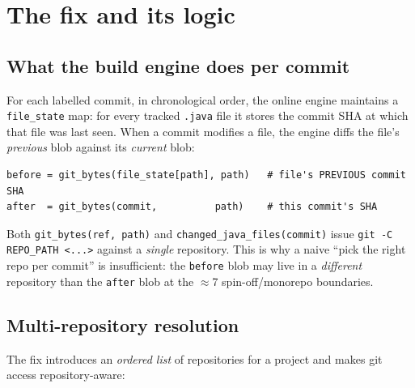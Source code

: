 \documentclass[11pt]{article}
\newcommand{\code}[1]{\texttt{#1}}
\begin{document}
\section{The fix and its logic}
\label{sec:fix}

\subsection{What the build engine does per commit}
For each labelled commit, in chronological order, the online engine maintains a
\code{file\_state} map: for every tracked \code{.java} file it stores the commit
SHA at which that file was last seen. When a commit modifies a file, the engine
diffs the file's \emph{previous} blob against its \emph{current} blob:

\begin{lstlisting}
before = git_bytes(file_state[path], path)   # file's PREVIOUS commit SHA
after  = git_bytes(commit,          path)    # this commit's SHA
\end{lstlisting}

Both \code{git\_bytes(ref, path)} and \code{changed\_java\_files(commit)} issue
\code{git -C REPO\_PATH <...>} against a \emph{single} repository. This is why a
naive ``pick the right repo per commit'' is insufficient: the \code{before} blob
may live in a \emph{different} repository than the \code{after} blob at the
$\approx$7 spin-off/monorepo boundaries.

\subsection{Multi-repository resolution}
The fix introduces an \emph{ordered list} of repositories for a project and makes
git access repository-aware:
\end{document}
